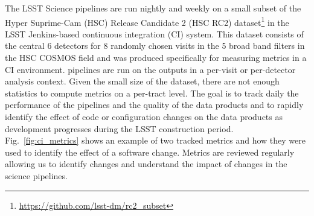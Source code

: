 The LSST Science pipelines are run nightly and weekly on a small subset of the Hyper Suprime-Cam (HSC) Release Candidate 2 (HSC RC2) dataset\footnote{\url{https://github.com/lsst-dm/rc2_subset}} in the LSST Jenkins-based continuous integration (CI) system.
This dataset consists of the central 6 detectors for 8 randomly chosen visits in the 5 broad band filters in the HSC COSMOS field and was produced specifically for measuring metrics in a CI environment.
\faro pipelines are run on the outputs in a per-visit or per-detector analysis context.
Given the small size of the dataset, there are not enough statistics to compute metrics on a per-tract level.
The goal is to track daily the performance of the pipelines and the quality of the data products and to rapidly identify the effect of code or configuration changes on the data products as development progresses during the LSST construction period.
Fig.~\ref{fig:ci_metrics} shows an example of two tracked metrics and how they were used to identify the effect of a software change.
Metrics are reviewed regularly allowing us to identify changes and understand the impact of changes in the science pipelines.

